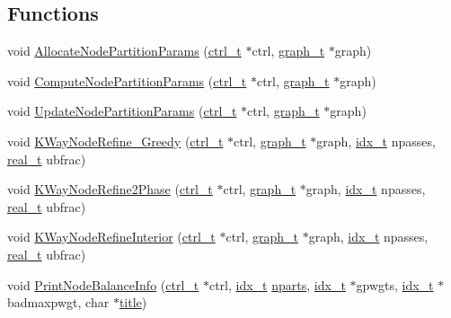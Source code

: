 \subsection*{Functions}
\begin{DoxyCompactItemize}
\item 
void \hyperlink{a00383_a3f8a334ec92f8da97ad3b2aa2e83fda4}{Allocate\+Node\+Partition\+Params} (\hyperlink{a00742}{ctrl\+\_\+t} $\ast$ctrl, \hyperlink{a00734}{graph\+\_\+t} $\ast$graph)
\item 
void \hyperlink{a00383_a2693025c208df9d9f71b7c546a613789}{Compute\+Node\+Partition\+Params} (\hyperlink{a00742}{ctrl\+\_\+t} $\ast$ctrl, \hyperlink{a00734}{graph\+\_\+t} $\ast$graph)
\item 
void \hyperlink{a00383_a78090b8f3c50c64cc9541791df72d3cb}{Update\+Node\+Partition\+Params} (\hyperlink{a00742}{ctrl\+\_\+t} $\ast$ctrl, \hyperlink{a00734}{graph\+\_\+t} $\ast$graph)
\item 
void \hyperlink{a00383_a5c9aaeced318b88b4ad50dcb484d47b1}{K\+Way\+Node\+Refine\+\_\+\+Greedy} (\hyperlink{a00742}{ctrl\+\_\+t} $\ast$ctrl, \hyperlink{a00734}{graph\+\_\+t} $\ast$graph, \hyperlink{a00876_aaa5262be3e700770163401acb0150f52}{idx\+\_\+t} npasses, \hyperlink{a00876_a1924a4f6907cc3833213aba1f07fcbe9}{real\+\_\+t} ubfrac)
\item 
void \hyperlink{a00383_a5c42d043dc7f9e6d0b955a4d004a7470}{K\+Way\+Node\+Refine2\+Phase} (\hyperlink{a00742}{ctrl\+\_\+t} $\ast$ctrl, \hyperlink{a00734}{graph\+\_\+t} $\ast$graph, \hyperlink{a00876_aaa5262be3e700770163401acb0150f52}{idx\+\_\+t} npasses, \hyperlink{a00876_a1924a4f6907cc3833213aba1f07fcbe9}{real\+\_\+t} ubfrac)
\item 
void \hyperlink{a00383_ad38351510bbf07393425b90ea3c4f5bd}{K\+Way\+Node\+Refine\+Interior} (\hyperlink{a00742}{ctrl\+\_\+t} $\ast$ctrl, \hyperlink{a00734}{graph\+\_\+t} $\ast$graph, \hyperlink{a00876_aaa5262be3e700770163401acb0150f52}{idx\+\_\+t} npasses, \hyperlink{a00876_a1924a4f6907cc3833213aba1f07fcbe9}{real\+\_\+t} ubfrac)
\item 
void \hyperlink{a00383_a209dbc8b8ae14de6f02ff22f00a60d3c}{Print\+Node\+Balance\+Info} (\hyperlink{a00742}{ctrl\+\_\+t} $\ast$ctrl, \hyperlink{a00876_aaa5262be3e700770163401acb0150f52}{idx\+\_\+t} \hyperlink{a00879_aad88065af88fd6759101788a8e15ce9e}{nparts}, \hyperlink{a00876_aaa5262be3e700770163401acb0150f52}{idx\+\_\+t} $\ast$gpwgts, \hyperlink{a00876_aaa5262be3e700770163401acb0150f52}{idx\+\_\+t} $\ast$badmaxpwgt, char $\ast$\hyperlink{a00617_a051e403214cb6872ad3fe4e50302a6ee}{title})
\end{DoxyCompactItemize}


